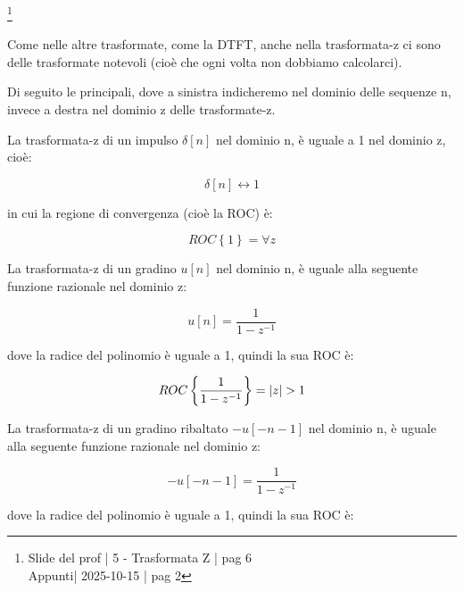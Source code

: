 \footnote{ 
    Slide del prof | 5 - Trasformata Z | pag 6 \\
    Appunti| 2025-10-15 | pag 2
}

Come nelle altre trasformate, come la DTFT, anche nella trasformata-z ci sono delle trasformate notevoli (cioè che ogni volta non dobbiamo calcolarci). \newline 

Di seguito le principali, dove a sinistra indicheremo nel dominio delle sequenze n, invece a destra nel dominio z delle trasformate-z. \newline 

La trasformata-z di un impulso $\delta \left[ n\right]$ nel dominio n, è uguale a 1 nel dominio z, cioè: 

{
    \Large 
    \begin{equation}
        \delta \left[ n\right]
        \leftrightarrow 
        1
    \end{equation}
}
 
in cui la regione di convergenza (cioè la ROC) è: 

{
    \Large 
    \begin{equation}
        ROC \left\{ 1\right\} = \forall z
    \end{equation}
}

La trasformata-z di un gradino $u \left[ n\right]$ nel dominio n, è uguale alla seguente funzione razionale nel dominio z: 

{
    \Large 
    \begin{equation}
        u \left[ n\right] 
        = 
        \dfrac{1}{1 - z^{-1}}
    \end{equation}
}

dove la radice del polinomio è uguale a 1, quindi la sua ROC è: 

{
    \Large 
    \begin{equation}
        ROC \left\{ \dfrac{1}{1 - z^{-1}} \right\} = \abs{z} > 1
    \end{equation}
}

La trasformata-z di un gradino ribaltato $- u \left[ - n - 1\right]$ nel dominio n, è uguale alla seguente funzione razionale nel dominio z: 

{
    \Large 
    \begin{equation}
        - u \left[ - n - 1\right] 
        = 
        \dfrac{1}{1 - z^{-1}}
    \end{equation}
}

dove la radice del polinomio è uguale a 1, quindi la sua ROC è: 

